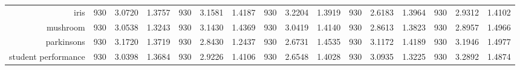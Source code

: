 \begin{table}[htbp]
{\begin{tabular}{rccccccccccccccc}
			iris                                & 930                                 & 3.0720                                                                    & 1.3757          & 930                            & 3.1581                                                                             & 1.4187          & 930                             & 3.2204                                                                    & 1.3919          & 930                             & \cellcolor[rgb]{ .776,  .937,  .808}\textcolor[rgb]{ 0,  .38,  0}{2.6183} & 1.3964          & 930                             & 2.9312          & 1.4102          \\
			mushroom                            & 930                                 & 3.0538                                                                    & 1.3243          & 930                            & 3.1430                                                                             & 1.4369          & 930                             & 3.0419                                                                    & 1.4140          & 930                             & \cellcolor[rgb]{ .776,  .937,  .808}\textcolor[rgb]{ 0,  .38,  0}{2.8613} & 1.3823          & 930                             & 2.8957          & 1.4966          \\
			parkinsons                          & 930                                 & 3.1720                                                                    & 1.3719          & 930                            & 2.8430                                                                             & 1.2437          & 930                             & \cellcolor[rgb]{ .776,  .937,  .808}\textcolor[rgb]{ 0,  .38,  0}{2.6731} & 1.4535          & 930                             & 3.1172                                                                    & 1.4189          & 930                             & 3.1946          & 1.4977          \\
			student performance                 & 930                                 & 3.0398                                                                    & 1.3684          & 930                            & 2.9226                                                                             & 1.4106          & 930                             & \cellcolor[rgb]{ .776,  .937,  .808}\textcolor[rgb]{ 0,  .38,  0}{2.6548} & 1.4028          & 930                             & 3.0935                                                                    & 1.3225          & 930                             & 3.2892          & 1.4874          \\

\end{tabular}}
\end{table}
